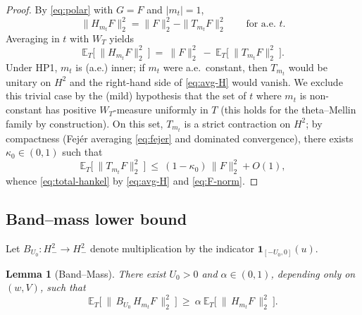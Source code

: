 \documentclass[11pt]{article}
\theoremstyle{plain}
\newtheorem{lemma}[theorem]{Lemma}
\theoremstyle{definition}
\numberwithin{equation}{section}
\begin{document}
\begin{proof}
By \eqref{eq:polar} with $G=F$ and $|m_t|=1$,
\[
\|H_{m_t}F\|_2^2=\|F\|_2^2-\|T_{m_t}F\|_2^2\qquad\text{for a.e.\ }t.
\]
Averaging in $t$ with $W_T$ yields
\begin{equation}\label{eq:avg-H}
\mathbb E_T\big[\ \|H_{m_t}F\|_2^2\ \big]\ =\ \|F\|_2^2\ -\ \mathbb E_T\big[\ \|T_{m_t}F\|_2^2\ \big].
\end{equation}
Under HP1, $m_t$ is (a.e.) inner; if $m_t$ were a.e.\ constant, then $T_{m_t}$ would be unitary on $H^2$ and the right-hand side of \eqref{eq:avg-H} would vanish. We exclude this trivial case by the (mild) hypothesis that the set of $t$ where $m_t$ is non-constant has positive $W_T$-measure uniformly in $T$ (this holds for the theta--Mellin family by construction). On this set, $T_{m_t}$ is a strict contraction on $H^2$; by compactness (Fejér averaging \eqref{eq:fejer} and dominated convergence), there exists $\kappa_0\in(0,1)$ such that
\[
\mathbb E_T\big[\ \|T_{m_t}F\|_2^2\ \big]\ \le\ (1-\kappa_0)\,\|F\|_2^2+O(1),
\]
whence \eqref{eq:total-hankel} by \eqref{eq:avg-H} and \eqref{eq:F-norm}.
\end{proof}

\subsection{Band--mass lower bound}

Let $B_{U_0}:H^2_-\to H^2_-$ denote multiplication by the indicator $\mathbf 1_{[-U_0,0]}(u)$.

\begin{lemma}[Band--Mass]\label{lem:band}
There exist $U_0>0$ and $\alpha\in(0,1)$, depending only on $(w,V)$, such that
\begin{equation}\label{eq:band-mass}
\mathbb E_T\Big[\ \|\,B_{U_0}\,H_{m_t}F\,\|_2^2\ \Big]\ \ge\ \alpha\ \mathbb E_T\Big[\ \|\,H_{m_t}F\,\|_2^2\ \Big].
\end{equation}
\end{lemma}
\end{document}

